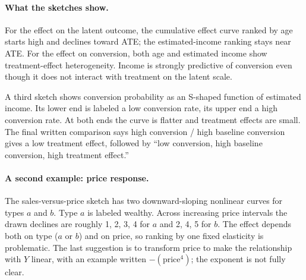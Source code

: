{\paragraph{What the sketches show.}
For the effect on the latent outcome, the cumulative effect curve ranked by age starts high and declines toward ATE; the estimated-income ranking stays near ATE. For the effect on conversion, both age and estimated income show treatment-effect heterogeneity. Income is strongly predictive of conversion even though it does not interact with treatment on the latent scale.

A third sketch shows conversion probability as an S-shaped function of estimated income. Its lower end is labeled a low conversion rate, its upper end a high conversion rate. At both ends the curve is flatter and treatment effects are small. The final written comparison says high conversion / high baseline conversion gives a low treatment effect, followed by ``low conversion, high baseline conversion, high treatment effect.''

\paragraph{A second example: price response.}
The sales-versus-price sketch has two downward-sloping nonlinear curves for types $a$ and $b$. Type $a$ is labeled wealthy. Across increasing price intervals the drawn declines are roughly 1, 2, 3, 4 for $a$ and 2, 4, 5 for $b$. The effect depends both on type ($a$ or $b$) and on price, so ranking by one fixed elasticity is problematic. The last suggestion is to transform price to make the relationship with $Y$ linear, with an example written $-(\mathrm{price}^{4})$; the exponent is not fully clear.

\begin{center}
\begin{tikzpicture}[>=Stealth, font=\small, line width=.65pt]


\end{tikzpicture}
\end{center}}
